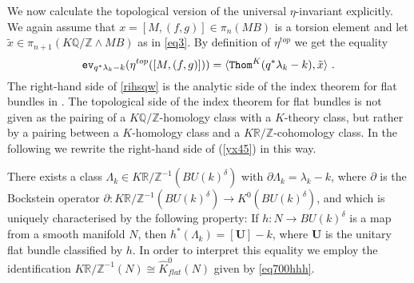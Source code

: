 \documentclass[12pt]{article}
\newcommand{\Thom}{{\tt Thom}}
\newcommand{\ev}{{\tt ev}}
\newcommand{\Z}{{\mathbb{Z}}}
\newcommand{\Q}{{\mathbb{Q}}}
\newcommand{\R}{{\mathbb{R}}}
\newcommand{\bU}{{\mathbf{U}}}
\begin{document}
We now calculate the topological version of the universal $\eta$-invariant explicitly.
We again assume that $x=[M,(f,g)]\in \pi_{n}(MB)$ is a torsion element and let $\tilde x\in \pi_{n+1}(K\Q/\Z\wedge MB)$  as in \eqref{eq3}. By definition of $\eta^{top}$ we get
the equality  \begin{equation}\label{yx45}\ev_{q^{*}\lambda_{k}-k}(\eta^{top}([M,(f,g)]))=\langle \Thom^{K}(q^{*}\lambda_{k}-k),\tilde x \rangle \ .\end{equation}
The right-hand side of \eqref{rihsqw} is the analytic side of the index theorem for flat bundles in  \cite[Thm. 5.3]{MR0397799}.
The topological side of the index theorem for flat bundles  \cite[Thm. 5.3]{MR0397799} is not given as the pairing of a $K\Q/\Z$-homology class with a $K$-theory class, but rather by a pairing between a $K$-homology class and  a $K\R/\Z$-cohomology class. In the following we rewrite  the right-hand side of (\ref{yx45}) in this way.   

There exists a class $\Lambda_{k} \in K\R/\Z^{-1}(BU(k)^{\delta})$ with $\partial \Lambda_{k}=\lambda_{k}-k$, where  $\partial$ is the  Bockstein operator
$\partial:  K\R/\Z^{-1}(BU(k)^{\delta})\to K^{0}(BU(k)^{\delta})$, and which is uniquely characterised  by the following property:
If $h:N\to BU(k)^{\delta}$ is a map from a smooth manifold $N$, then
$h^{*}(\Lambda_{k})=[\bU]-k$, where
$\bU$ is the  unitary flat bundle classified by $h$. In order to interpret this equality we employ the identification $
    K\R/\Z^{-1}(N)\cong \hat K_{flat}^{0}(N) $ given by \eqref{eq700hhh}. 
\end{document}

